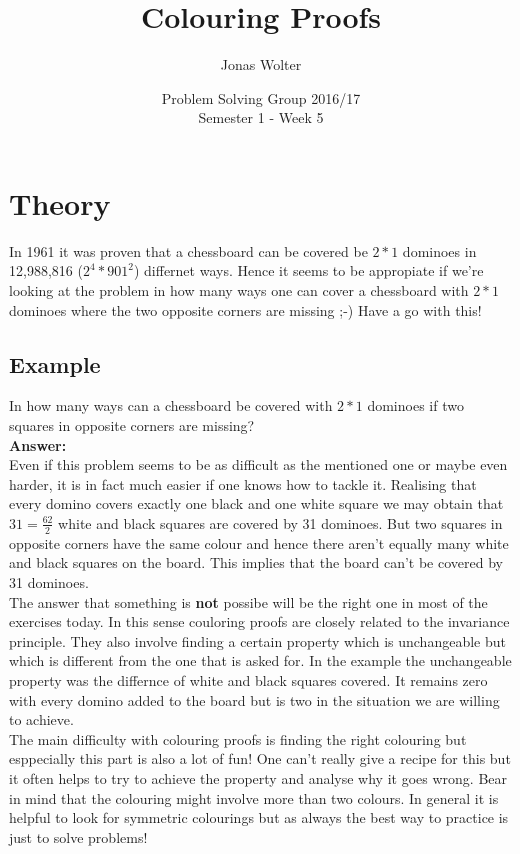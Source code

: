 \documentclass[11pt,a5paper]{article}
\title{\textbf{Colouring Proofs}}
\date{Problem Solving Group 2016/17  \\
Semester 1 - Week 5}
\author{Jonas Wolter}
\begin{document}
\maketitle

\section{Theory}
In 1961 it was proven that a chessboard can be covered be $2*1$ dominoes in 12,988,816 ($2^4*901^2$) differnet ways. Hence it seems to be appropiate if we're looking at the problem in how many ways one can cover a chessboard with $2*1$ dominoes where the two opposite corners are missing ;-) Have a go with this!

\subsection{Example}
In how many ways can a chessboard be covered with $2*1$ dominoes if two squares in opposite corners are missing?\\
\textbf{Answer:}\\
Even if this problem seems to be as difficult as the mentioned one or maybe even harder, it is in fact much easier if one knows how to tackle it. Realising that every domino covers exactly one black and one white square we may obtain that $31=\frac{62}{2}$ white and black squares are covered by 31 dominoes. But two squares in opposite corners have the same colour and hence there aren't equally many white and black squares on the board. This implies that the board can't be covered by 31 dominoes.\\[0.2cm]

\noindent 
The answer that something is \textbf{not} possibe will be the right one in most of the exercises today. In this sense couloring proofs are closely related to the invariance principle. They also involve finding a certain property which is unchangeable but which is different from the one that is asked for. In the example the unchangeable property was the differnce of white and black squares covered. It remains zero with every domino added to the board but is two in the situation we are willing to achieve.\\
The main difficulty with colouring proofs is finding the right colouring but esppecially this part is also a lot of fun! One can't really give a recipe for this but it often helps to try to achieve the property and analyse why it goes wrong. Bear in mind that the colouring might involve more than two colours.  In general it is helpful to look for symmetric colourings but as always the best way to practice is just to solve problems!
\end{document}
